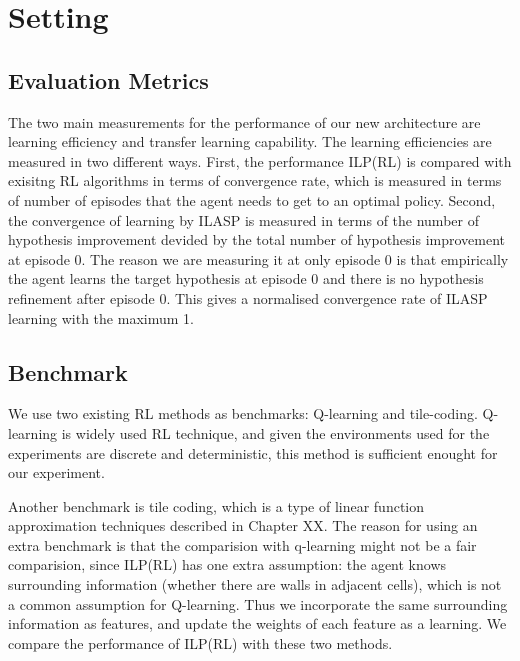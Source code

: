 \section{Setting}

\subsection{Evaluation Metrics}

The two main measurements for the performance of our new architecture are learning efficiency and transfer learning capability.
The learning efficiencies are measured in two different ways. First, the performance ILP(RL) is compared with exisitng RL algorithms in terms of
convergence rate, which is measured in terms of number of episodes that the agent needs to get to an optimal policy.
Second, the convergence of learning by ILASP is measured in terms of the number of hypothesis improvement devided by the total number of hypothesis improvement at episode 0.
The reason we are measuring it at only episode 0 is that empirically the agent learns the target hypothesis at episode 0 and there is no hypothesis refinement after episode 0.
This gives a normalised convergence rate of ILASP learning with the maximum 1.

\subsection{Benchmark}
We use two existing RL methods as benchmarks: Q-learning and tile-coding.
Q-learning is widely used RL technique, and given the environments used for the experiments are discrete and deterministic, this method is sufficient enought for our experiment.

Another benchmark is tile coding, which is a type of linear function approximation techniques described in Chapter XX.
The reason for using an extra benchmark is that the comparision with q-learning might not be a fair comparision,
since ILP(RL) has one extra assumption: the agent knows surrounding information (whether there are walls in adjacent cells),
which is not a common assumption for Q-learning. Thus we incorporate the same surrounding information as features, and update the weights of each feature as a learning.
We compare the performance of ILP(RL) with these two methods.

